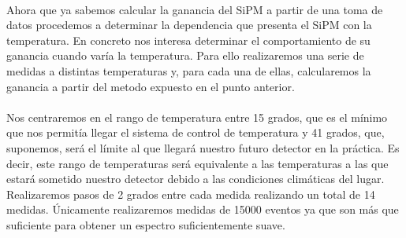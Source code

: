 \documentclass[11pt, a4paper]{article}
\begin{document}
\paragraph {}
Ahora que ya sabemos calcular la ganancia del SiPM a partir de una toma de datos procedemos a determinar la dependencia que presenta el SiPM con la temperatura. En concreto nos interesa determinar el comportamiento de su ganancia cuando varía la temperatura. Para ello realizaremos una serie de medidas a distintas temperaturas y, para cada una de ellas, calcularemos la ganancia a partir del metodo expuesto en el punto anterior.

\paragraph {}
Nos centraremos en el rango de temperatura entre 15 grados, que es el mínimo que nos permitía llegar el sistema de control de temperatura y 41 grados, que, suponemos, será el límite al que llegará nuestro futuro detector en la práctica. Es decir, este rango de temperaturas será equivalente a las temperaturas a las que estará sometido nuestro detector debido a las condiciones climáticas del lugar. Realizaremos pasos de 2 grados entre cada medida realizando un total de 14 medidas. Únicamente realizaremos medidas de 15000 eventos ya que son más que suficiente para obtener un espectro suficientemente suave. 
\end{document}
